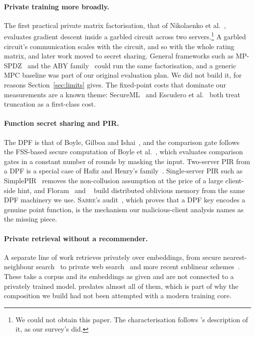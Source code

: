 \paragraph{Private training more broadly.} The first practical private matrix
factorisation, that of Nikolaenko et al.~\cite{nikolaenko2013}, evaluates
gradient descent inside a garbled circuit across two
servers.\footnote{We could not obtain this paper. The characterisation follows
\nudgeplain{}'s description of it, as our survey's did.} A garbled circuit's
communication scales with the circuit, and so with the whole rating matrix, and
later work moved to secret sharing. General frameworks such as MP-SPDZ~\cite{mpspdz2020} and the ABY
family~\cite{aby2015,aby22021} could run the same factorisation, and a generic
MPC baseline was part of our original evaluation plan. We did not build it, for
reasons Section~\ref{sec:limits} gives. The fixed-point costs that dominate our
measurements are a known theme: SecureML~\cite{secureml2017} and Escudero et
al.~\cite{escudero2020} both treat truncation as a first-class cost.

\paragraph{Function secret sharing and PIR.} The DPF is that of Boyle, Gilboa and
Ishai~\cite{gilboa2014,bgi2015,bgi2016}, and the comparison gate follows the
FSS-based secure computation of Boyle et al.~\cite{boyle2021}, which evaluates
comparison gates in a constant number of rounds by masking the input. Two-server
PIR from a DPF is a special case of Hafiz and Henry's family~\cite{hafiz2019}.
Single-server PIR such as SimplePIR~\cite{simplepir2023} removes the
non-collusion assumption at the price of a large client-side hint, and
Floram~\cite{floram2017} and \duoramplain{}~\cite{duoram2023} build distributed
oblivious memory from the same DPF machinery we use. \textsc{Sabre}'s
audit~\cite{sabre2022}, which proves that a DPF key encodes a genuine point
function, is the mechanism our malicious-client analysis names as the missing
piece.

\paragraph{Private retrieval without a recommender.} A separate line of work
retrieves privately over embeddings, from secure nearest-neighbour
search~\cite{sanns2020} to private web search~\cite{tiptoe2023} and more recent
sublinear schemes~\cite{pacmann2025,compass2025,panther2025,wally2024}. These
take a corpus and its embeddings as given and are not connected to a privately
trained model. \pirsonaplain{} predates almost all of them, which is part of why
the composition we build had not been attempted with a modern training core.


